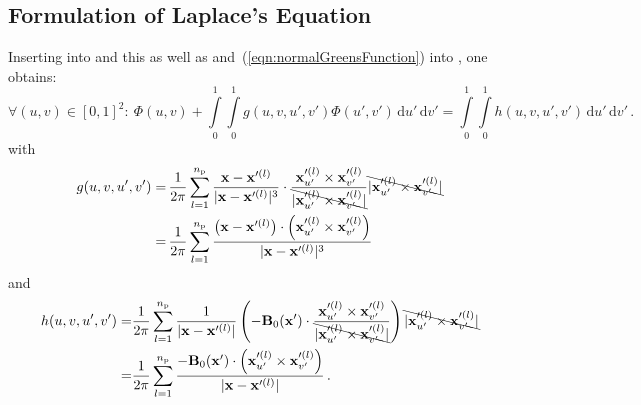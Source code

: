 \subsection{Formulation of Laplace's Equation}
Inserting  into  and this as well as  and~(\ref{eqn:normalGreensFunction}) into , one obtains:
\begin{equation}
  \forall (u,v) \in [0,1]^2: ~
    \Phi(u,v)
  + \int\limits_0^1 \int\limits_0^1
      g(u,v,u',v')
      \Phi(u', v')
      \,\mathrm{d}u' \,\mathrm{d}v'
  = \int\limits_0^1 \int\limits_0^1
      h(u,v,u',v')
      \,\mathrm{d}u' \,\mathrm{d}v' \, .
  \label{eqn:laplaceIntegralUV}
\end{equation}
with
\begin{align}
    g(u,v,u',v')
  =& \, \frac{1}{2 \pi}
    \sum\limits_{l=1}^{n_\mathrm{p}}
    \frac{\mathbf{x}-\mathbf{x}'^{(l)}}{|\mathbf{x}-\mathbf{x}'^{(l)}|^3} \cdot \frac{\mathbf{x}'^{(l)}_{u'} \times \mathbf{x}'^{(l)}_{v'}}{ \bcancel{|\mathbf{x}'^{(l)}_{u'} \times \mathbf{x}'^{(l)}_{v'}|} }
    \bcancel{|\mathbf{x}'^{(l)}_{u'} \times \mathbf{x}'^{(l)}_{v'}|} \nonumber \\
  =& \, \frac{1}{2 \pi}
    \sum\limits_{l=1}^{n_\mathrm{p}}
    \frac{ \left( \mathbf{x}-\mathbf{x}'^{(l)} \right) \cdot \left( \mathbf{x}'^{(l)}_{u'} \times \mathbf{x}'^{(l)}_{v'} \right) }{|\mathbf{x}-\mathbf{x}'^{(l)}|^3} \label{eqn:def_g}
\end{align}
and
\begin{align}
    h(u,v,u',v')
  =& \frac{1}{2 \pi}
    \sum\limits_{l=1}^{n_\mathrm{p}} \frac{1}{|\mathbf{x}-\mathbf{x}'^{(l)}|}
    \left( - \mathbf{B}_0(\mathbf{x}') \cdot \frac{\mathbf{x}'^{(l)}_{u'} \times \mathbf{x}'^{(l)}_{v'}}{ \bcancel{|\mathbf{x}'^{(l)}_{u'} \times \mathbf{x}'^{(l)}_{v'}|} } \right)
    \bcancel{|\mathbf{x}'^{(l)}_{u'} \times \mathbf{x}'^{(l)}_{v'}|} \nonumber \\
  =&\frac{1}{2 \pi}
    \sum\limits_{l=1}^{n_\mathrm{p}}
    \frac{ - \mathbf{B}_0(\mathbf{x}') \cdot \left( \mathbf{x}'^{(l)}_{u'} \times \mathbf{x}'^{(l)}_{v'} \right) }{|\mathbf{x}-\mathbf{x}'^{(l)}|} \, . \label{eqn:def_h}
\end{align}

\FloatBarrier
